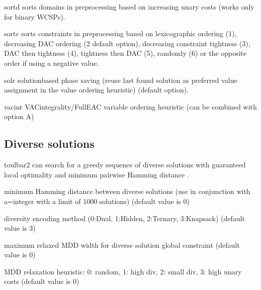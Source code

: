 \documentclass[letterpaper,10pt,openany,oneside,english]{sphinxmanual}
\begin{document}
\begin{optionlist}{3cm}
\item [\sphinxhyphen{}sortd]  
\sphinxAtStartPar
sorts domains in preprocessing based on increasing unary costs
(works only for binary WCSPs).
\item [\sphinxhyphen{}sortc]  
\sphinxAtStartPar
sorts constraints in preprocessing based on lexicographic ordering (1), decreasing DAC ordering (2 \sphinxhyphen{} default option), decreasing constraint tightness (3), DAC then tightness (4), tightness then DAC (5), randomly (6) or the opposite order if using a negative value.
\item [\sphinxhyphen{}solr]  
\sphinxAtStartPar
solution\sphinxhyphen{}based phase saving (reuse last found solution as preferred value assignment in the value ordering heuristic) (default option).
\item [\sphinxhyphen{}vacint]  
\sphinxAtStartPar
VAC\sphinxhyphen{}integrality/Full\sphinxhyphen{}EAC variable ordering heuristic (can be combined with option \sphinxhyphen{}A)
\end{optionlist}


\subsection{Diverse solutions}
\label{\detokenize{userdoc:diverse-solutions}}
\sphinxAtStartPar
toulbar2 can search for a greedy sequence of diverse solutions with guaranteed local optimality and minimum pairwise Hamming distance .
\begin{description}
\sphinxAtStartPar
minimum Hamming distance between diverse solutions (use in conjunction
with \sphinxhyphen{}a=integer with a limit of 1000 solutions) (default value is 0)

\sphinxAtStartPar
diversity encoding method (0:Dual, 1:Hidden, 2:Ternary, 3:Knapsack)
(default value is 3)

\sphinxAtStartPar
maximum relaxed MDD width for diverse solution global constraint
(default value is 0)

\sphinxAtStartPar
MDD relaxation heuristic: 0: random, 1: high div, 2: small div,
3: high unary costs (default value is 0)

\end{description}
\end{document}
